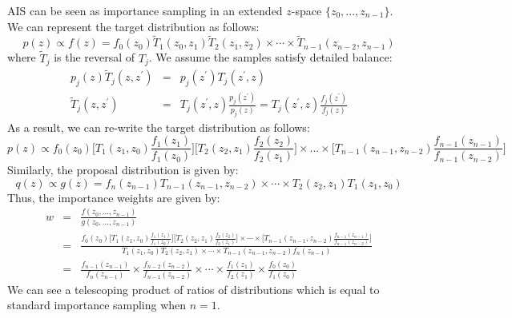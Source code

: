 AIS can be seen as importance sampling in an extended $z$-space $\{z_0,...,z_{n-1}\}$. We can represent the target distribution as follows:
\begin{equation}
    p(z) \propto f(z) = f_0(z_0)\tilde{T}_1(z_0, z_1)\tilde{T}_2(z_1, z_2)\times \cdots \times \tilde{T}_{n-1}(z_{n-2}, z_{n-1})
\end{equation}
where $\tilde{T}_{j}$ is the reversal of $T_j$. We assume the samples satisfy detailed balance:
\begin{eqnarray}
   p_j(z)\tilde{T}_{j}(z, z^{\prime}) &=& p_j(z^{\prime})T_{j}(z^{\prime}, z) \\
   \tilde{T}_{j}(z, z^{\prime}) &=& T_{j}(z^{\prime}, z)\frac{p_j(z^{\prime})}{p_{j}(z)} = T_{j}(z^{\prime}, z)\frac{f_j(z^{\prime})}{f_j(z)}
\end{eqnarray}
As a result, we can re-write the target distribution as follows:
\begin{equation}
   p(z) \propto f_0(z_0)\bigg[T_1(z_1, z_0)\frac{f_1(z_1)}{f_1(z_0)}\bigg]\bigg[T_2(z_2, z_1)\frac{f_2(z_2)}{f_2(z_1)}\bigg]\times ... \times \bigg[T_{n-1}(z_{n-1}, z_{n-2})\frac{f_{n-1}(z_{n-1})}{f_{n-1}(z_{n-2})}\bigg] 
\end{equation}
Similarly, the proposal distribution is given by:
\begin{equation}
    q(z) \propto g(z) = f_{n}(z_{n-1})T_{n-1}(z_{n-1}, z_{n-2})\times \cdots \times T_2(z_2, z_1)T_1(z_1, z_0)
\end{equation}
Thus, the importance weights are given by:
\begin{eqnarray}
    w &=& \frac{f(z_0,...,z_{n-1})}{g(z_0,...,z_{n-1})} \nonumber \\ 
      &=& \frac{f_0(z_0)\bigg[T_1(z_1, z_0)\frac{f_1(z_1)}{f_1(z_0)}\bigg]\bigg[T_2(z_2, z_1)\frac{f_2(z_2)}{f_2(z_1)}\bigg]\times \cdots \times \bigg[T_{n-1}(z_{n-1}, z_{n-2})\frac{f_{n-1}(z_{n-1})}{f_{n-1}(z_{n-2})}\bigg]}{T_1(z_1, z_0)T_2(z_2, z_1)\times \cdots \times T_{n-1}(z_{n-1}, z_{n-2})f_n(z_{n-1})} \nonumber \\
    &=& \frac{f_{n-1}(z_{n-1})}{f_n(z_{n-1})}\times \frac{f_{n-2}(z_{n-2})}{f_{n-1}(z_{n-2})}\times \cdots \times \frac{f_1(z_1)}{f_2(z_1)}\times \frac{f_0(z_0)}{f_1(z_0)}
\end{eqnarray}
We can see a telescoping product of ratios of distributions which is equal to standard importance sampling when $n=1$.\\ 

